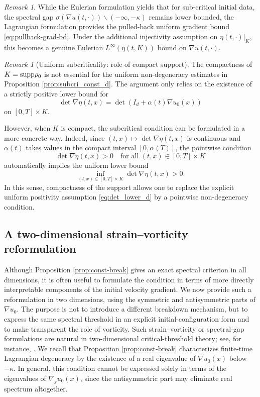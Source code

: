 \documentclass[11pt]{amsart}
\numberwithin{equation}{section}
\theoremstyle{definition}
\theoremstyle{remark}
\newtheorem{remark}[theorem]{Remark}
\numberwithin{equation}{section}
\newtheorem{remark}[theorem]{Remark}
\newcommand{\supp}{{\rm supp}}
\newcommand{\nabS}{\nabla_{\!\!{}_S}}
\begin{document}
\begin{remark}
While the  Eulerian formulation yields that for sub-critical initial data,
the spectral gap $\sigma(\nabla u(t,\cdot))\backslash (-\infty,-\kappa)$ remains  lower bounded,  the Lagrangian formulation provides  the pulled-back uniform gradient bound \eqref{eq:pullback-grad-bd}. Under the additional injectivity
assumption on $\eta(t,\cdot)|_K$, this becomes a genuine Eulerian $L^\infty(\eta(t,K))$ bound on $\nabla u(t,\cdot)$.
\end{remark}

\begin{remark}[Uniform subcriticality: role of compact support]%
The compactness of $K=\supp\rho_0$ is not essential for the uniform non-degeneracy estimates in Proposition \ref{prop:subcri_const_d}. The argument only relies on the existence of a strictly positive lower bound for 
\[
\det\nabla\eta(t,x)=\det(I_d + \alpha(t)\nabla u_0(x))
\]
 on $[0,T]\times K$.

However, when $K$ is compact, the subcritical condition can be formulated in a more concrete way. Indeed, since $(t,x)\mapsto \det\nabla\eta(t,x)$ is continuous and $\alpha(t)$ takes values in the compact interval $[0,\alpha(T)]$, the pointwise condition
\[
\det\nabla\eta(t,x)>0
\quad \text{for all } (t,x)\in[0,T]\times K
\]
automatically implies the uniform lower bound
\[
\inf_{(t,x)\in[0,T]\times K}\det\nabla\eta(t,x)>0.
\]
In this sense, compactness of the support allows one to replace the explicit uniform positivity assumption \eqref{eq:det_lower_d} by a pointwise non-degeneracy condition.
\end{remark}
  
 
%
%
%                       
%
%
 
 
\subsection{A two-dimensional strain--vorticity reformulation}
 
Although Proposition \ref{prop:const-break} gives an exact spectral criterion in all dimensions, it is often useful to formulate the condition in terms of more directly interpretable components of the initial velocity gradient. We now provide such a reformulation in two dimensions, using the symmetric and antisymmetric parts of $\nabla u_0$. The purpose is not to introduce a different breakdown mechanism, but to express the same spectral threshold in an explicit initial-configuration form and to make transparent the role of vorticity. Such strain--vorticity or spectral-gap formulations are natural in two-dimensional critical-threshold theory; see, for instance, \cite{LT04}. 
We recall that Proposition \ref{prop:const-break} characterizes finite-time Lagrangian degeneracy by the existence of a real eigenvalue of $\nabla u_0(x)$ below $-\kappa$. In general, this condition cannot be expressed solely in terms of the eigenvalues of $\nabS u_0(x)$, since the antisymmetric part may eliminate real spectrum altogether.
\end{document}
